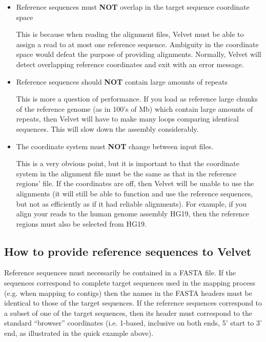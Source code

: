 \documentclass[12pt]{article}
\begin{document}
\begin{itemize}
\item Reference sequences must \textbf{NOT} overlap in the target sequence coordinate space

This is because when reading the alignment files, Velvet must be able to assign a read to at most one reference sequence. Ambiguity in the coordinate space would defeat the purpose of providing alignments. Normally, Velvet will detect overlapping reference coordinates and exit with an error message.

\item Reference sequences should \textbf{NOT} contain large amounts of repeats

This is more a question of performance. If you load as reference large chunks of the reference genome (as in 100's of Mb) which contain large amounts of repeats, then Velvet will have to make many loops comparing identical sequences. This will slow down the assembly considerably.

\item The coordinate system must \textbf{NOT} change between input files. 

This is a very obvious point, but it is important to that the coordinate system in the alignment file must be the same as that in the reference regions' file. If the coordinates are off, then Velvet will be unable to use the alignments (it will still be able to function and use the reference sequences, but not as efficiently as if it had reliable alignments). For example, if you align your reads to the human genome assembly HG19, then the reference regions must also be selected from HG19.

\end{itemize}

\subsection{How to provide reference sequences to Velvet}

Reference sequences must necessarily be contained in a FASTA file. If the sequences correspond to complete target sequences used in the mapping
process (e.g. when mapping to contigs) then the names in the FASTA headers must be identical to those of the target sequences. If the reference
sequences correspond to a subset of one of the target sequences, then its header must correspond to the standard ``browser'' coordinates (i.e.
1-based, inclusive on both ends, 5' start to 3' end, as illustrated in the quick example above).
\end{document}
